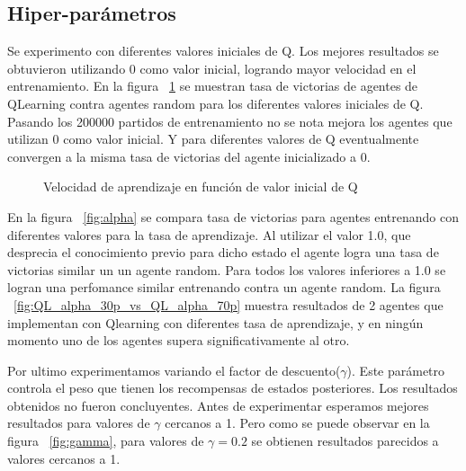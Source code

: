 
\subsection{Hiper-parámetros}

Se experimento con diferentes valores iniciales de Q. Los mejores resultados se obtuvieron utilizando 0 como valor inicial, logrando mayor velocidad en el entrenamiento. En la figura ~\ref{fig:qinit} se muestran tasa de victorias de agentes de QLearning contra agentes random para los diferentes valores iniciales de Q. Pasando los 200000 partidos de entrenamiento no se nota mejora los agentes que utilizan 0 como valor inicial. Y para diferentes valores de Q eventualmente convergen a la misma tasa de victorias del agente inicializado a 0. 

\begin{figure}[H]
\begin{center}
\caption{Velocidad de aprendizaje en función de valor inicial de Q}
\label{fig:qinit}
\end{center}
\end{figure}


En la figura ~\ref{fig:alpha} se compara tasa de victorias para agentes entrenando con diferentes valores para la tasa de aprendizaje. Al utilizar el valor 1.0, que desprecia el conocimiento previo para dicho estado el agente logra una tasa de victorias similar un un agente random. Para todos los valores inferiores a 1.0 se logran una perfomance similar entrenando contra un agente random. La figura ~\ref{fig:QL_alpha_30p_vs_QL_alpha_70p} muestra resultados de 2 agentes que implementan con Qlearning con diferentes tasa de aprendizaje, y en ningún momento uno de los agentes supera significativamente al otro. 
 
\begin{figure}[H]
\begin{center}
\caption{}
\label{fig:alphag}
\end{center}
\end{figure}

Por ultimo experimentamos variando el factor de descuento($\gamma$). Este parámetro controla el peso que tienen los recompensas de estados posteriores. Los resultados obtenidos no fueron concluyentes. Antes de experimentar esperamos mejores resultados para valores de $\gamma$ cercanos a 1. Pero como se puede observar en la figura ~\ref{fig:gamma}, para valores de  $\gamma=0.2$ se obtienen resultados parecidos a valores cercanos a 1.


